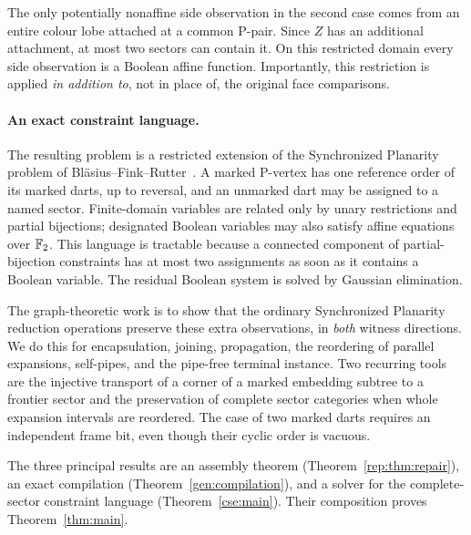 The only potentially nonaffine side observation in the second case comes
from an entire colour lobe attached at a common P-pair.  Since $Z$ has an
additional attachment, at most two sectors can contain it.  On this
restricted domain every side observation is a Boolean affine function.
Importantly, this restriction is applied \emph{in addition to}, not in
place of, the original face comparisons.

\paragraph{An exact constraint language.}
The resulting problem is a restricted extension of the Synchronized
Planarity problem of Bl\"asius--Fink--Rutter~\cite{bfr}.  A marked
P-vertex has one reference order of its marked darts, up to reversal, and
an unmarked dart may be assigned to a named sector.  Finite-domain
variables are related only by unary restrictions and partial bijections;
designated Boolean variables may also satisfy affine equations over
$\mathbb F_2$.  This language is tractable because a connected component of
partial-bijection constraints has at most two assignments as soon as it
contains a Boolean variable.  The residual Boolean system is solved by
Gaussian elimination.

The graph-theoretic work is to show that the ordinary Synchronized
Planarity reduction operations preserve these extra observations, in
\emph{both} witness directions.  We do this for encapsulation, joining,
propagation, the reordering of parallel expansions, self-pipes, and the
pipe-free terminal instance.  Two recurring tools are the injective
transport of a corner of a marked embedding subtree to a frontier sector
and the preservation of complete sector categories when whole expansion
intervals are reordered.  The case of two marked darts requires an
independent frame bit, even though their cyclic order is vacuous.

The three principal results are an assembly theorem
(Theorem~\ref{rep:thm:repair}), an exact compilation
(Theorem~\ref{gen:compilation}), and a solver for the complete-sector
constraint language (Theorem~\ref{cse:main}).  Their composition proves
Theorem~\ref{thm:main}.

